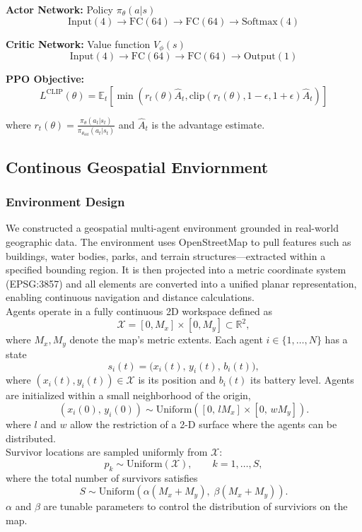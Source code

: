 \documentclass[conference]{IEEEtran}
\begin{document}
\textbf{Actor Network:} Policy $\pi_\theta(a|s)$
\begin{equation}
    \text{Input}(4) \rightarrow \text{FC}(64) \rightarrow \text{FC}(64) \rightarrow \text{Softmax}(4)
\end{equation}

\textbf{Critic Network:} Value function $V_\phi(s)$
\begin{equation}
    \text{Input}(4) \rightarrow \text{FC}(64) \rightarrow \text{FC}(64) \rightarrow \text{Output}(1)
\end{equation}

\textbf{PPO Objective:}
\begin{equation}
    L^{\text{CLIP}}(\theta) = \mathbb{E}_t\left[\min\left(r_t(\theta)\hat{A}_t, \text{clip}(r_t(\theta), 1-\epsilon, 1+\epsilon)\hat{A}_t\right)\right]
\end{equation}

where $r_t(\theta) = \frac{\pi_\theta(a_t|s_t)}{\pi_{\theta_{\text{old}}}(a_t|s_t)}$ and $\hat{A}_t$ is the advantage estimate.

\subsection{Continous Geospatial Enviornment}
\subsubsection{Environment Design}
We constructed a geospatial multi-agent environment grounded in real-world geographic data. The environment uses OpenStreetMap to pull features such as buildings, water bodies, parks, and terrain structures—extracted within a specified bounding region. It is then projected into a metric coordinate system (EPSG:3857) and all elements are converted into a unified planar representation, enabling continuous navigation and distance calculations.  
\\[0.5em]
Agents operate in a fully continuous 2D workspace defined as
\[
\mathcal{X} = [0, M_x] \times [0, M_y] \subset \mathbb{R}^2,
\]
where \(M_x, M_y\) denote the map's metric extents. Each agent \(i \in \{1, \dots, N\}\) has a state
\[
s_i(t) = \big(x_i(t),\, y_i(t),\, b_i(t)\big),
\]
where \((x_i(t), y_i(t)) \in \mathcal{X}\) is its position and \(b_i(t)\) its battery level. Agents are initialized within a small neighborhood of the origin,
\[
(x_i(0),\, y_i(0)) \sim \mathrm{Uniform}\!\left([0,\, l M_x] \times [0,\, w M_y]\right).
\] 
where $l$ and $w$ allow the restriction of a 2-D surface where the agents can be distributed. \\[0.5em]
Survivor locations are sampled uniformly from \(\mathcal{X}\):
\[
p_k \sim \mathrm{Uniform}(\mathcal{X}), \qquad k = 1, \dots, S,
\]
where the total number of survivors satisfies
\[
S \sim \mathrm{Uniform}\!\left(\alpha(M_x + M_y),\; \beta(M_x + M_y)\right).
\] 
$\alpha$ and $\beta$ are tunable parameters to control the distribution of surviviors on the map.
\end{document}
